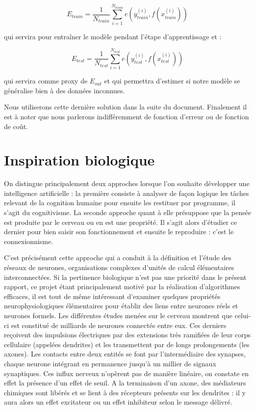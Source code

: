 \documentclass{report}
\begin{document}
\begin{equation}
E_{train} = \frac{1}{N_{train}}\sum_{i=1}^{N_{train}}{e(y^{(i)}_{train}, f(x^{(i)}_{train}))}
\end{equation}

qui servira pour entraîner le modèle pendant l'étape d'apprentissage et :

\begin{equation}
E_{test} = \frac{1}{N_{test}}\sum_{i=1}^{N_{test}}{e(y^{(i)}_{test}, f(x^{(i)}_{test}))}
\end{equation}

qui servira comme proxy de $E_{out}$ et qui permettra d'estimer si notre modèle se généralise bien à des données inconnues.

Nous utiliserons cette dernière solution dans la suite du document. Finalement il est à noter que nous parlerons indifféremment de fonction d'erreur ou de fonction de coût.

\section{Inspiration biologique}

On distingue principalement deux approches lorsque l’on souhaite développer une intelligence artificielle : la première consiste à analyser de façon logique les tâches relevant de la cognition humaine pour ensuite les restituer par programme, il s’agit du cognitivisme. La seconde approche quant à elle présuppose que la pensée est produite par le cerveau ou en est une propriété. Il s'agit alors d’étudier ce dernier pour bien saisir son fonctionnement et ensuite le reproduire : c’est le connexionnisme.

C'est précisément cette approche qui a conduit à la définition et l'étude des réseaux de neurones, organisations complexes d’unités de calcul élémentaires interconnectées. Si la pertinence biologique n'est pas une priorité dans le présent rapport, ce projet étant principalement motivé par la réalisation d’algorithmes efficaces, il est tout de même intéressant d’examiner quelques propriétés neurophysiologiques élémentaires pour établir des liens entre neurones réels et neurones formels.
Les différentes études menées sur le cerveau montrent que celui-ci est constitué de milliards de neurones connectés entre eux. Ces derniers reçoivent des impulsions électriques par des extensions très ramifiées de leur corps cellulaire (appelées dendrites) et les transmettent par de longs prolongements (les axones). Les contacts entre deux entités se font par l’intermédiaire des synapses, chaque neurone intégrant en permanence jusqu'à un millier de signaux synaptiques. Ces influx nerveux n'opèrent pas de manière linéaire, on constate en effet la présence d’un effet de seuil. A la terminaison d’un axone, des médiateurs chimiques sont libérés et se lient à des récepteurs présents sur les dendrites : il y aura alors un effet excitateur ou un effet inhibiteur selon le message délivré.
\end{document}
